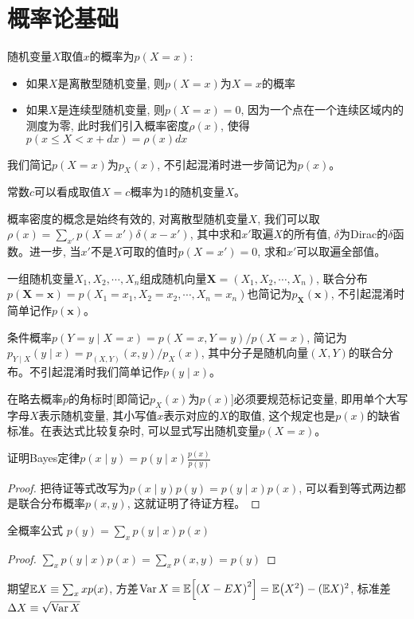 \chapter{概率论基础}
\par 随机变量$X$取值$x$的概率为$p(X=x)$:
\begin{itemize}
    \item 如果$X$是离散型随机变量, 则$p(X=x)$为$X=x$的概率
    \item 如果$X$是连续型随机变量, 则$p(X=x)=0$, 因为一个点在一个连续区域内的测度为零, 此时我们引入概率密度$\rho(x)$, 使得$p(x\leq X<x+dx)=\rho(x)dx$
\end{itemize}
我们简记$p(X=x)$为$p_X(x)$, 不引起混淆时进一步简记为$p(x)$。
\par 常数$c$可以看成取值$X=c$概率为$1$的随机变量$X$。
\par 概率密度的概念是始终有效的, 对离散型随机变量$X$, 我们可以取$\rho(x)=\sum_{x'}p(X=x')\delta(x-x')$, 其中求和$x'$取遍$X$的所有值, $\delta$为Dirac的$\delta$函数。进一步, 当$x'$不是$X$可取的值时$p(X=x')=0$, 求和$x'$可以取遍全部值。
\par 一组随机变量$X_1,X_2,\cdots,X_n$组成随机向量$\bm X=(X_1,X_2,\cdots,X_n)$, 联合分布$p(\bm X=\bm x)=p(X_1=x_1,X_2=x_2,\cdots,X_n=x_n)$也简记为$p_{\bm X}(\bm x)$, 不引起混淆时简单记作$p(\bm x)$。
\par 条件概率$p(Y=y\mid X=x)=p(X=x,Y=y)/p(X=x)$, 简记为$p_{Y\mid X}(y\mid x)=p_{(X,Y)}(x,y)/p_X(x)$, 其中分子是随机向量$(X,Y)$的联合分布。不引起混淆时我们简单记作$p(y\mid x)$。
\par{}\quad 在略去概率$p$的角标时[即简记$p_X(x)$为$p(x)$]必须要规范标记变量, 即用单个大写字母$X$表示随机变量, 其小写值$x$表示对应的$X$的取值, 这个规定也是$p(x)$的缺省标准。在表达式比较复杂时, 可以显式写出随机变量$p(X=x)$。
\begin{exercise}[教材A.1] 证明Bayes定律$p(x\mid y)=p(y\mid x)\frac{p(x)}{p(y)}$
\end{exercise}
\begin{proof}
    把待证等式改写为$p(x\mid y)p(y)=p(y\mid x)p(x)$, 可以看到等式两边都是联合分布概率$p(x,y)$, 这就证明了待证方程。
\end{proof}
\begin{exercise}[教材A.2]
    全概率公式 $p(y)=\sum_x p(y\mid x)p(x)$
\end{exercise}
\begin{proof}
    $\sum_x p(y\mid x)p(x)=\sum_x p(x,y)=p(y)$
\end{proof}
\par 期望$\mathbb{E} X\equiv\sum_x xp(x)$, 方差$\operatorname{{\rm Var}} X\equiv\mathbb{E}\qty[\qty(X-EX)^2]=\mathbb{E}\qty(X^2)-(\mathbb{E} X)^2$, 标准差$\Delta X\equiv\sqrt{\operatorname{{\rm Var}} X}$

